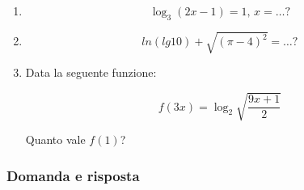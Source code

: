 \begin{enumerate}
\item \[
\log_3(2x-1)=1\textrm{, }x=\ldots?
\]


\item 
\[ %
ln(lg 10)+ \sqrt{(\pi -4)^2}=\ldots?
\]


\item 
Data la seguente funzione:

\[
f(3x)=\log_2{\sqrt{\frac{9x+1}{2}}}
\]

Quanto vale $f(1)$?


\end{enumerate}

\subsubsection{Domanda e risposta}\label{subsec:dom_risp}


